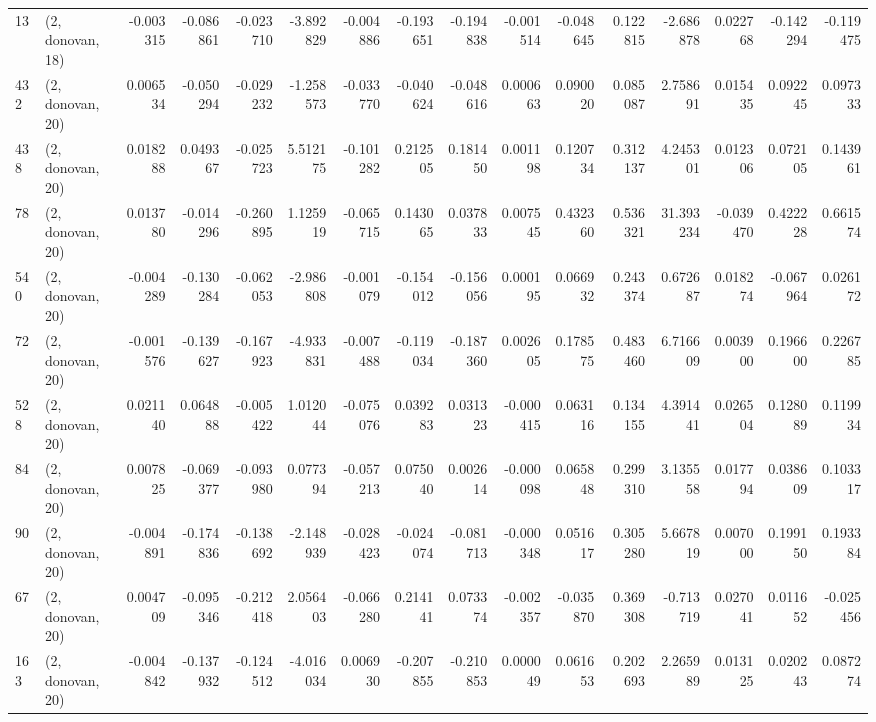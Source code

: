 \begin{tabular}{llrrrrrrrrrrrrrr}
13  &  (2, donovan, 18) &  -0.003315 & -0.086861 & -0.023710 &   -3.892829 & -0.004886 &  -0.193651 &  -0.194838 & -0.001514 & -0.048645 &  0.122815 &   -2.686878 &  0.022768 &  -0.142294 &  -0.119475 \\
432 &  (2, donovan, 20) &   0.006534 & -0.050294 & -0.029232 &   -1.258573 & -0.033770 &  -0.040624 &  -0.048616 &  0.000663 &  0.090020 &  0.085087 &    2.758691 &  0.015435 &   0.092245 &   0.097333 \\
438 &  (2, donovan, 20) &   0.018288 &  0.049367 & -0.025723 &    5.512175 & -0.101282 &   0.212505 &   0.181450 &  0.001198 &  0.120734 &  0.312137 &    4.245301 &  0.012306 &   0.072105 &   0.143961 \\
78  &  (2, donovan, 20) &   0.013780 & -0.014296 & -0.260895 &    1.125919 & -0.065715 &   0.143065 &   0.037833 &  0.007545 &  0.432360 &  0.536321 &   31.393234 & -0.039470 &   0.422228 &   0.661574 \\
540 &  (2, donovan, 20) &  -0.004289 & -0.130284 & -0.062053 &   -2.986808 & -0.001079 &  -0.154012 &  -0.156056 &  0.000195 &  0.066932 &  0.243374 &    0.672687 &  0.018274 &  -0.067964 &   0.026172 \\
72  &  (2, donovan, 20) &  -0.001576 & -0.139627 & -0.167923 &   -4.933831 & -0.007488 &  -0.119034 &  -0.187360 &  0.002605 &  0.178575 &  0.483460 &    6.716609 &  0.003900 &   0.196600 &   0.226785 \\
528 &  (2, donovan, 20) &   0.021140 &  0.064888 & -0.005422 &    1.012044 & -0.075076 &   0.039283 &   0.031323 & -0.000415 &  0.063116 &  0.134155 &    4.391441 &  0.026504 &   0.128089 &   0.119934 \\
84  &  (2, donovan, 20) &   0.007825 & -0.069377 & -0.093980 &    0.077394 & -0.057213 &   0.075040 &   0.002614 & -0.000098 &  0.065848 &  0.299310 &    3.135558 &  0.017794 &   0.038609 &   0.103317 \\
90  &  (2, donovan, 20) &  -0.004891 & -0.174836 & -0.138692 &   -2.148939 & -0.028423 &  -0.024074 &  -0.081713 & -0.000348 &  0.051617 &  0.305280 &    5.667819 &  0.007000 &   0.199150 &   0.193384 \\
67  &  (2, donovan, 20) &   0.004709 & -0.095346 & -0.212418 &    2.056403 & -0.066280 &   0.214141 &   0.073374 & -0.002357 & -0.035870 &  0.369308 &   -0.713719 &  0.027041 &   0.011652 &  -0.025456 \\
163 &  (2, donovan, 20) &  -0.004842 & -0.137932 & -0.124512 &   -4.016034 &  0.006930 &  -0.207855 &  -0.210853 &  0.000049 &  0.061653 &  0.202693 &    2.265989 &  0.013125 &   0.020243 &   0.087274 \\

\end{tabular}
